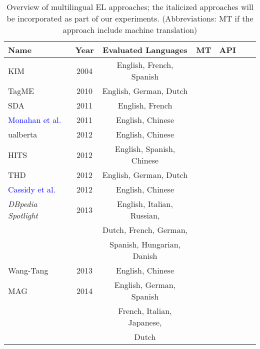 \documentclass{llncs}
\newcommand{\cmark}{\ding{51}}%
\newcommand{\xmark}{}%
\begin{document}
\begin{table}[th!]
	\centering
	\caption{Overview of multilingual EL approaches; the italicized approaches will be incorporated as part of our experiments. (Abbreviations: MT if the approach include machine translation)}
	\label{tab:multilingual_approaches}
	\setlength{\tabcolsep}{3pt}
	\begin{tabular}{lcccccr}
		\toprule
		\textbf{Name} &  \textbf{Year} & \textbf{Evaluated Languages} & \textbf{MT} & \textbf{API}\\ \midrule
		
		KIM \cite{KIM-popov2004kim} & 2004 &English, French, Spanish&\xmark&\cmark\\\midrule
        
        TagME \cite{ferragina2010tagme} & 2010 & English, German, Dutch &\xmark&\cmark\\\midrule
		
		SDA \cite{SDA-charton2011automatic}  & 2011 &English, French&\xmark&\xmark\\\midrule
        
        \textcolor{blue}{Monahan et al.}~\cite{Monahan2011} & 2011 & English, Chinese&\cmark & \xmark\\\midrule 
		
		ualberta \cite{guo2012ualberta}& 2012 &English, Chinese&\xmark&\xmark\\\midrule
		
		HITS \cite{fahrni2012hits} & 2012 & English, Spanish, Chinese&\xmark&\xmark\\\midrule
		
		THD \cite{THD-dojchinovski2012recognizing}  & 2012 &English, German, Dutch&\xmark&\cmark\\\midrule 
        
        \textcolor{blue}{Cassidy et al.}~\cite{Cassidy2012} & 2012  &English, Chinese&\cmark \xmark\\\midrule 
		
		\textit{DBpedia Spotlight}~\cite{daiber2013improving} & 2013  &English, Italian, Russian,&\xmark&\cmark\\
		& &Dutch, French, German,&&&\\
		& &Spanish, Hungarian, Danish&&&\\\midrule
		
		Wang-Tang \cite{wang2013boosting} & 2013 & English, Chinese&\xmark&\xmark\\\midrule
		
		MAG \cite{mag2017}& 2014 & English, German, Spanish&\xmark&\cmark\\
		& &French, Italian, Japanese,&&&\\
		& &Dutch&&&\\\midrule
		

\end{tabular}
\end{table}
\end{document}

